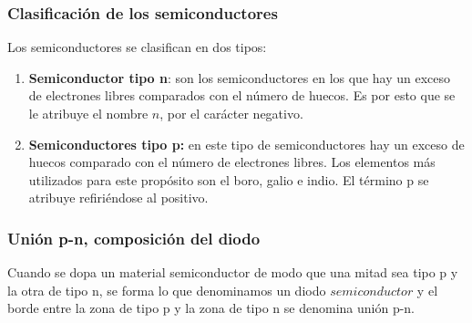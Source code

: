 \documentclass[twocolumn]{revtex4-2}
\begin{document}
\subsubsection{Clasificación de los semiconductores}
Los semiconductores se clasifican en dos tipos:
\begin{enumerate}
    \item \textbf{Semiconductor tipo n}: son los semiconductores en los que hay un exceso de electrones libres comparados con el número de huecos. Es por esto que se le atribuye el nombre $n$, por el carácter negativo. ~\cite{rosadio}
    \item \textbf{Semiconductores tipo p:} en este tipo de semiconductores hay un exceso de huecos comparado con el número de electrones libres. Los elementos más utilizados para este propósito son el boro, galio e indio. El término p se atribuye refiriéndose al positivo. ~\cite{rosadio}
    
\end{enumerate}
\subsubsection{Unión p-n, composición del diodo}
Cuando se dopa un material semiconductor de modo que una mitad sea tipo p y la otra de tipo n, se forma lo que denominamos un diodo $semiconductor$ y el borde entre la zona de tipo p y la zona de tipo n se denomina unión p-n. ~\cite{rosadio}
\end{document}
